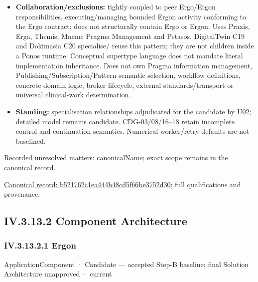 \begin{itemize}
\item \textbf{Collaboration/exclusions:} tightly coupled to peer Ergo/Ergon responsibilities,
  executing/managing bounded Ergon activity conforming to the Ergo contract;
  does not structurally contain Ergo or Ergon. Uses Praxis, Erga, Themis, Mneme
  Pragma Management and Petasos. DigitalTwin C19 and Dokimasia C20 specialise/
  reuse this pattern; they are not children inside a Ponos runtime. Conceptual
  supertype language does not mandate literal implementation inheritance.
  Does not own Pragma information management, Publishing/Subscription/Pattern
  semantic selection, workflow definitions, concrete domain logic, broker lifecycle,
  external standards/transport or universal clinical-work determination.

\item \textbf{Standing:} specialisation relationships adjudicated for the candidate by U02;
  detailed model remains candidate. CDG-03/08/16–18 retain incomplete control
  and continuation semantics. Numerical worker/retry defaults are not baselined.

\end{itemize}

{\small Recorded unresolved matters: canonicalName; exact scope remains in the canonical record.}\par
{\footnotesize \href{../../../../continuum/application/application-component/b521762c1ea444b48cd5f66be3752d30.md}{Canonical record: b521762c1ea444b48cd5f66be3752d30}; full qualifications and provenance.}\par
\subsection*{IV.3.13.2 Component Architecture}
\label{navigation:IV.3.13.2}

\subsubsection*{IV.3.13.2.1 Ergon}
\label{navigation:IV.3.13.2.1}

\label{element:49c9eb2bef0c47b8b5328621d5fc5479}
{\small ApplicationComponent · Candidate — accepted Step-B baseline; final Solution Architecture unapproved · current}\par

